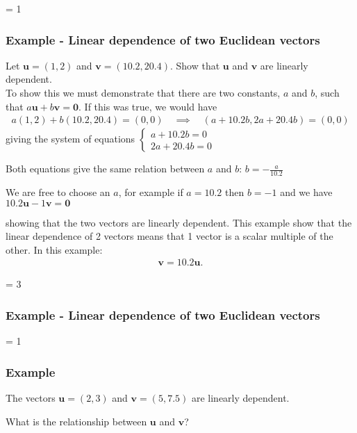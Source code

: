 \documentclass[usenames,dvipsnames,aspectratio=169,10pt]{beamer}
\def \EXAMPLEVERSION {3} %
\numberwithin{equation}{section}
\begin{document}
\ifnum \EXAMPLEVERSION = 1
\begin{frame}
\frametitle{Example - Linear dependence of two Euclidean vectors}

\noindent Let $\mathbf{u}=(1,2)$ and $\mathbf{v}=(10.2,20.4)$. Show that $\mathbf{u}$ and $\mathbf{v}$ are linearly dependent. \\

\noindent To show this we must demonstrate that there are two constants, $a$ and $b$, such that $a\mathbf{u} + b\mathbf{v} = \mathbf{0}$. If this was true, we would have
\begin{align*}
a(1,2) + b(10.2,20.4) = (0,0)  \quad \implies \quad (a + 10.2b,2a + 20.4b) = (0,0)
\end{align*}
giving the system of equations
$
\begin{cases}
a + 10.2b = 0 \\
2a + 20.4b = 0
\end{cases}
$

Both equations give the same relation between $a$ and $b$:
$
b = -\frac{a}{10.2}
$

We are free to choose an $a$, for example if $a=10.2$ then $b=-1$ and we have
$
10.2 \mathbf{u} - 1 \mathbf{v} = \mathbf{0}
$

showing that the two vectors are linearly dependent. This example show that the linear dependence of 2 vectors means that 1 vector is a scalar multiple of the other. In this example:
\begin{align*}
\mathbf{v} = 10.2 \mathbf{u}.
\end{align*}
\end{frame}
\fi


\ifnum \EXAMPLEVERSION = 3
\begin{frame}
\frametitle{Example - Linear dependence of two Euclidean vectors}
\end{frame}
\fi 



\ifnum \EXAMPLEVERSION = 1
\begin{frame}
\frametitle{Example}

The vectors $\mathbf{u}=(2,3)$ and $\mathbf{v}=(5,7.5)$ are linearly dependent.

What is the relationship between $\mathbf{u}$ and $\mathbf{v}$?
\end{frame}
\end{document}
